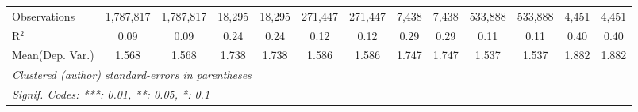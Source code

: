 \begin{tabular}{lcccccccccccc}
   Observations                             & 1,787,817     & 1,787,817       & 18,295        & 18,295         & 271,447       & 271,447         & 7,438       & 7,438          & 533,888       & 533,888        & 4,451         & 4,451\\  
   R$^2$                                    & 0.09          & 0.09            & 0.24          & 0.24           & 0.12          & 0.12            & 0.29        & 0.29           & 0.11          & 0.11           & 0.40          & 0.40\\  
Mean(Dep. Var.) & 1.568 & 1.568 & 1.738 & 1.738 & 1.586 & 1.586 & 1.747 & 1.747 & 1.537 & 1.537 & 1.882 & 1.882 \\
   \midrule \midrule
   \multicolumn{13}{l}{\emph{Clustered (author) standard-errors in parentheses}}\\
   \multicolumn{13}{l}{\emph{Signif. Codes: ***: 0.01, **: 0.05, *: 0.1}}\\
\end{tabular}
\par\endgroup
